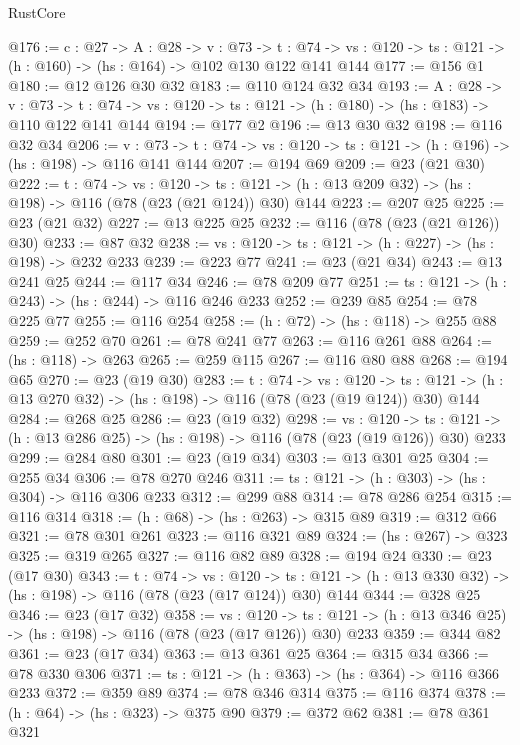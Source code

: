 \begin{lexlean}{RustCore}
\begin{coremodule}
@176 := {c : @27} ->
  {A : @28} ->
  {v : @73} ->
  {t : @74} -> {vs : @120} -> {ts : @121} -> (h : @160) -> (hs : @164) -> @102 @130 @122 @141 @144
@177 := @156 @1
@180 := @12 @126 @30 @32
@183 := @110 @124 @32 @34
@193 := {A : @28} ->
  {v : @73} ->
  {t : @74} -> {vs : @120} -> {ts : @121} -> (h : @180) -> (hs : @183) -> @110 @122 @141 @144
@194 := @177 @2
@196 := @13 @30 @32
@198 := @116 @32 @34
@206 := {v : @73} ->
  {t : @74} -> {vs : @120} -> {ts : @121} -> (h : @196) -> (hs : @198) -> @116 @141 @144
@207 := @194 @69
@209 := @23 (@21 @30)
@222 := {t : @74} ->
  {vs : @120} ->
  {ts : @121} -> (h : @13 @209 @32) -> (hs : @198) -> @116 (@78 (@23 (@21 @124)) @30) @144
@223 := @207 @25
@225 := @23 (@21 @32)
@227 := @13 @225 @25
@232 := @116 (@78 (@23 (@21 @126)) @30)
@233 := @87 @32
@238 := {vs : @120} -> {ts : @121} -> (h : @227) -> (hs : @198) -> @232 @233
@239 := @223 @77
@241 := @23 (@21 @34)
@243 := @13 @241 @25
@244 := @117 @34
@246 := @78 @209 @77
@251 := {ts : @121} -> (h : @243) -> (hs : @244) -> @116 @246 @233
@252 := @239 @85
@254 := @78 @225 @77
@255 := @116 @254
@258 := (h : @72) -> (hs : @118) -> @255 @88
@259 := @252 @70
@261 := @78 @241 @77
@263 := @116 @261 @88
@264 := (hs : @118) -> @263
@265 := @259 @115
@267 := @116 @80 @88
@268 := @194 @65
@270 := @23 (@19 @30)
@283 := {t : @74} ->
  {vs : @120} ->
  {ts : @121} -> (h : @13 @270 @32) -> (hs : @198) -> @116 (@78 (@23 (@19 @124)) @30) @144
@284 := @268 @25
@286 := @23 (@19 @32)
@298 := {vs : @120} ->
  {ts : @121} -> (h : @13 @286 @25) -> (hs : @198) -> @116 (@78 (@23 (@19 @126)) @30) @233
@299 := @284 @80
@301 := @23 (@19 @34)
@303 := @13 @301 @25
@304 := @255 @34
@306 := @78 @270 @246
@311 := {ts : @121} -> (h : @303) -> (hs : @304) -> @116 @306 @233
@312 := @299 @88
@314 := @78 @286 @254
@315 := @116 @314
@318 := (h : @68) -> (hs : @263) -> @315 @89
@319 := @312 @66
@321 := @78 @301 @261
@323 := @116 @321 @89
@324 := (hs : @267) -> @323
@325 := @319 @265
@327 := @116 @82 @89
@328 := @194 @24
@330 := @23 (@17 @30)
@343 := {t : @74} ->
  {vs : @120} ->
  {ts : @121} -> (h : @13 @330 @32) -> (hs : @198) -> @116 (@78 (@23 (@17 @124)) @30) @144
@344 := @328 @25
@346 := @23 (@17 @32)
@358 := {vs : @120} ->
  {ts : @121} -> (h : @13 @346 @25) -> (hs : @198) -> @116 (@78 (@23 (@17 @126)) @30) @233
@359 := @344 @82
@361 := @23 (@17 @34)
@363 := @13 @361 @25
@364 := @315 @34
@366 := @78 @330 @306
@371 := {ts : @121} -> (h : @363) -> (hs : @364) -> @116 @366 @233
@372 := @359 @89
@374 := @78 @346 @314
@375 := @116 @374
@378 := (h : @64) -> (hs : @323) -> @375 @90
@379 := @372 @62
@381 := @78 @361 @321

\end{coremodule}
\end{lexlean}
